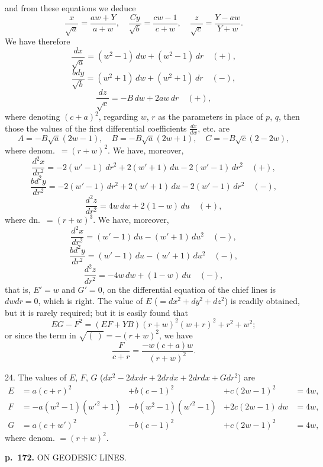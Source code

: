 \documentclass[11pt,a4paper]{article}
\begin{document}
and from these equations we deduce
\[
\frac{x}{\sqrt{a}} = \frac{aw + Y}{a + w}, \quad \frac{Cy}{\sqrt{b}} = \frac{cw - 1}{c + w}, \quad \frac{z}{\sqrt{c}} = \frac{Y - aw}{Y + w}.
\]
We have therefore
\[
\frac{dx}{\sqrt{a}} = (w^2 - 1)\, dw + (w^2 - 1)\, dr \quad (+),
\]
\[
\frac{bdy}{\sqrt{b}} = (w^2 + 1)\, dw + (w^2 + 1)\, dr \quad (-),
\]
\[
\frac{dz}{\sqrt{c}} = -B\, dw + 2aw \, dr \quad (+),
\]
where denoting $(c + a)^2$, regarding $w$, $r$ as the parameters in place of $p$, $q$, then those the values of the first differential coefficients $\frac{dx}{dw}$, etc. are
\[
A = -B\sqrt{a}\left(2w - 1\right), \quad B = -B\sqrt{a}\left(2w + 1\right), \quad C = -B\sqrt{c}\left(2 - 2w\right),
\]
where denom.\ $=(r + w)^2$.  We have, moreover,
\[
\frac{d^2 x}{dr^2} = -2(w' - 1)\, dr^2 + 2(w' + 1)\, du - 2(w' - 1)\, dr^2 \quad (+),
\]
\[
\frac{bd^2 y}{dr^2} = -2(w' - 1)\, dr^2 + 2(w' + 1)\, du - 2(w' - 1)\, dr^2 \quad (-),
\]
\[
\frac{d^2 z}{dr^2} = 4w \, dw + 2(1 - w)\, du \quad (+),
\]
where dn.\ $=(r + w)^3$.  We have, moreover,
\[
\frac{d^2 x}{dr^2} = (w' - 1)\, du - (w' + 1)\, du^2 \quad (-),
\]
\[
\frac{bd^2 y}{dr^2} = (w' - 1)\, du - (w' + 1)\, du^2 \quad (-),
\]
\[
\frac{d^2 z}{dr^2} = -4w\, dw + (1 - w)\, du \quad (-),
\]
that is, $E' = w$ and $G' = 0$, on the differential equation of the chief lines is $dw dr = 0$,
which is right.  The value of $E$ ($= dx^2 + dy^2 + dz^2$) is readily obtained, but it is rarely required; but it is easily found that
\[
EG - F^2 = (E F + Y B)(r + w)^2 (w + r)^2 + r^2 + w^2;
\]
or since the term in $\sqrt{(\ )} = -(r + w)^2$, we have
\[
\frac{F}{c+r} = \frac{-w(c + a)w}{(r + w)^2}.
\]

24. The values of $E$, $F$, $G$ ($dx^2 - 2dx dr + 2dr dx + 2dr dx + Gdr^2$) are
\begin{align*}
E &= a(c+r)^2  &+ b(c-1)^2  &+ c(2w-1)^2  &= 4w,\\
F &= -a(w^2 - 1)(w'^2 + 1) &- b(w^2 - 1)(w'^2 - 1) &+ 2c(2w - 1)\,dw  &= 4w,\\
G &= a(c+w')^2  &- b(c-1)^2  &+ c(2w-1)^2  &= 4w,
\end{align*}
where denom. $=(r + w)^2$.

\clearpage

\noindent
\textbf{p.~172.}  ON GEODESIC LINES.
\end{document}
